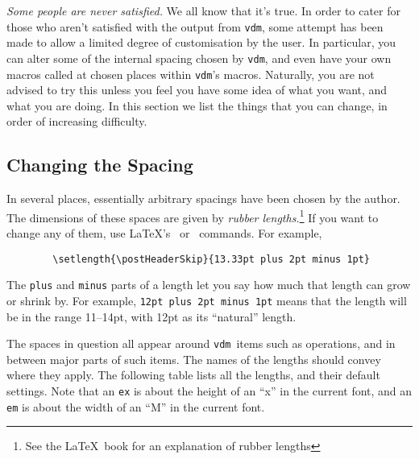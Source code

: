 \documentclass{article}
\newcommand{\Vdm}{{\tt vdm\/}}
\newenvironment{dangerous}{\par\vspace{5pt}\bgroup\small\noindent}%
                          {\par\egroup\vspace{5pt}}
\renewcommand{\^}[1]{$\langle${\rm #1\/}$\rangle$}
\newcommand{\cs}[1]{\leavevmode\hbox{\tt \string#1}}
\begin{document}
{\em Some people are never satisfied.}  We all know that it's true.
In order to cater for those who aren't satisfied with the output from
\Vdm, some attempt has been made to allow a limited degree of
customisation by the user.  In particular, you can alter some of the
internal spacing chosen by \Vdm, and even have your own macros called
at chosen places within \Vdm's macros.  Naturally, you are not advised
to try this unless you feel you have some idea of what you want, and
what you are doing.  In this section we list the things that you can
change, in order of increasing difficulty.

\subsection{Changing the Spacing}

In several places, essentially arbitrary spacings have been chosen by
the author.  The dimensions of these spaces are given by {\em rubber
lengths.}\footnote{See the \LaTeX\ book for an explanation of rubber
lengths}  If you want to change any of them, use \LaTeX's
\cs\setlength\ or \cs\addtolength\ commands.
For example,
\begin{verbatim}
        \setlength{\postHeaderSkip}{13.33pt plus 2pt minus 1pt}
\end{verbatim}

\begin{dangerous}
The {\tt plus} and {\tt minus} parts of a length let you say how much
that length can grow or shrink by.  For example, {\tt 12pt plus 2pt
minus 1pt} means that the length will be in the range 11--14pt, with
12pt as its ``natural'' length.
\end{dangerous}

The spaces in question all appear around \Vdm\ items such as
operations, and in between major parts of such items.  The names of
the lengths should convey where they apply.  The following table lists
all the lengths, and their default settings.  Note that an {\tt ex} is
about the height of an ``x'' in the current font, and an {\tt em} is
about the width of an ``M'' in the current font.
\end{document}
